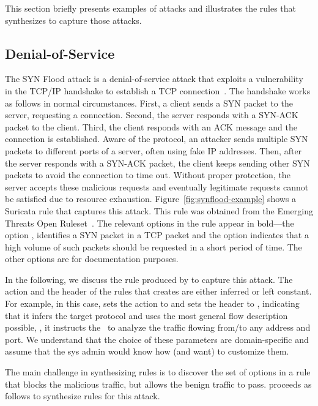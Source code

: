 \documentclass[sigconf,review, anonymous]{acmart}
\begin{document}
This section briefly presents examples of attacks and illustrates the
rules that \tname{} synthesizes to capture those attacks.


\subsection{Denial-of-Service}
\label{sec:dos}

The SYN Flood attack is a denial-of-service attack that exploits a vulnerability in the TCP/IP handshake
to establish a TCP connection~\cite{cloudfare-synflood}. The handshake
works as follows in normal circumstances. First, a client sends a SYN
packet to the server, requesting a connection. Second, the server
responds with a SYN-ACK packet to the client. Third, the client
responds with an ACK message and the connection is established. Aware
of the protocol, an attacker sends multiple SYN packets to different
ports of a server, often using fake IP addresses. Then, after the
server responds with a SYN-ACK packet, the client keeps sending other
SYN packets to avoid the connection to time out. Without proper
protection, the server accepts these malicious requests and eventually
legitimate requests cannot be satisfied due to resource exhaustion.
Figure~\ref{fig:synflood-example} shows a Suricata rule that captures
this attack. This rule was obtained from the Emerging Threats Open
Ruleset~\cite{emerging-threats-open}. The relevant options in the
rule appear in bold---the option , identifies a
SYN packet in a TCP packet and the option  indicates that a high
volume of such packets should be requested in a short period of
time. The other options are for documentation purposes.

In the following, we discuss the rule produced by \tname{} to capture
this attack. The action and the header of the rules that \tname{}
creates are either inferred or left constant. For example, in this
case, \tname{} sets the action to  and sets the header
to , indicating that it infers the
target protocol and uses the most general flow description possible,
\ie{}, it instructs the \nids\ to analyze the traffic flowing from/to
any address and port.  We understand that the choice of these
parameters are domain-specific and assume that the sys admin would
know how (and want) to customize them.

The main challenge in synthesizing rules is to discover the set of
options in a rule that blocks the malicious traffic, but allows the
benign traffic to pass. \tname{} proceeds as follows to synthesize
rules for this attack.
\end{document}
